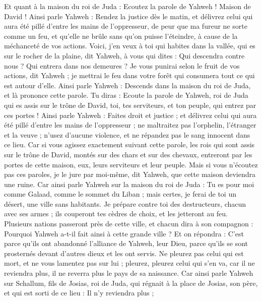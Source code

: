 \begin{multicols}{2}
Et quant à la maison du roi de Juda : Ecoutez la parole de Yahweh !
Maison de David ! Ainsi parle Yahweh : Rendez la justice dès le matin, et délivrez celui qui aura été pillé d'entre les mains de l'oppresseur, de peur que ma fureur ne sorte comme un feu, et qu'elle ne brûle sans qu'on puisse l'éteindre, à cause de la méchanceté de vos actions.
Voici, j'en veux à toi qui habites dans la vallée, qui es sur le rocher de la plaine, dit Yahweh, à vous qui dites : Qui descendra contre nous ? Qui entrera dans nos demeures ?
Je vous punirai selon le fruit de vos actions, dit Yahweh ; je mettrai le feu dans votre forêt qui consumera tout ce qui est autour d'elle.
\VerseOne{}Ainsi parle Yahweh : Descends dans la maison du roi de Juda, et là prononce cette parole.
Tu diras : Ecoute la parole de Yahweh, roi de Juda qui es assis sur le trône de David, toi, tes serviteurs, et ton peuple, qui entrez par ces portes !
Ainsi parle Yahweh : Faites droit et justice ; et délivrez celui qui aura été pillé d'entre les mains de l'oppresseur ; ne maltraitez pas l'orphelin, l'étranger et la veuve ; n'usez d'aucune violence, et ne répandez pas le sang innocent dans ce lieu.
Car si vous agissez exactement suivant cette parole, les rois qui sont assis sur le trône de David, montés sur des chars et sur des chevaux, entreront par les portes de cette maison, eux, leurs serviteurs et leur peuple.
Mais si vous n'écoutez pas ces paroles, je le jure par moi-même, dit Yahweh, que cette maison deviendra une ruine.
Car ainsi parle Yahweh sur la maison du roi de Juda : Tu es pour moi comme Galaad, comme le sommet du Liban ; mais certes, je ferai de toi un désert, une ville sans habitants.
Je prépare contre toi des destructeurs, chacun avec ses armes ; ils couperont tes cèdres de choix, et les jetteront au feu.
Plusieurs nations passeront près de cette ville, et chacun dira à son compagnon : Pourquoi Yahweh a-t-il fait ainsi à cette grande ville ?
Et on répondra : C'est parce qu'ils ont abandonné l'alliance de Yahweh, leur Dieu, parce qu'ils se sont prosternés devant d'autres dieux et les ont servis.
Ne pleurez pas celui qui est mort, et ne vous lamentez pas sur lui ; pleurez, pleurez celui qui s'en va, car il ne reviendra plus, il ne reverra plus le pays de sa naissance.
Car ainsi parle Yahweh sur Schallum, fils de Josias, roi de Juda, qui régnait à la place de Josias, son père, et qui est sorti de ce lieu : Il n'y reviendra plus ;

\end{multicols}
